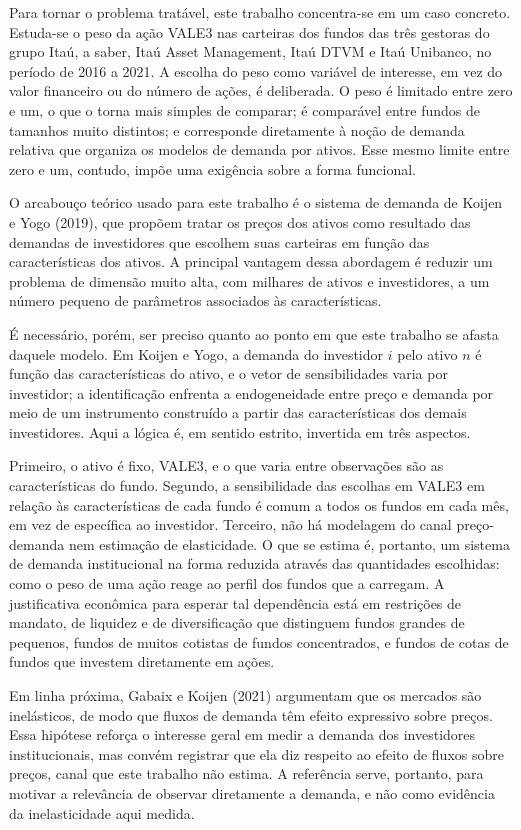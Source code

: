 \documentclass[12pt,a4paper]{article}
\begin{document}
Para tornar o problema tratável, este trabalho concentra-se em um caso concreto. Estuda-se o
peso da ação VALE3 nas carteiras dos fundos das três gestoras do grupo Itaú, a saber, Itaú
Asset Management, Itaú DTVM e Itaú Unibanco, no período de 2016 a 2021. A escolha do peso como
variável de interesse, em vez do valor financeiro ou do número de ações, é deliberada. O peso
é limitado entre zero e um, o que o torna mais simples de comparar; é comparável entre fundos
de tamanhos muito distintos; e corresponde diretamente à noção de demanda relativa que organiza
os modelos de demanda por ativos. Esse mesmo limite entre zero e um, contudo, impõe uma
exigência sobre a forma funcional.

O arcabouço teórico usado para este trabalho é o sistema de demanda de Koijen e Yogo (2019),
que propõem tratar os preços dos ativos como resultado das demandas de investidores que
escolhem suas carteiras em função das características dos ativos. A principal vantagem dessa
abordagem é reduzir um problema de dimensão muito alta, com milhares de ativos e investidores,
a um número pequeno de parâmetros associados às características.

É necessário, porém, ser preciso quanto ao ponto em que este trabalho se afasta daquele
modelo. Em Koijen e Yogo, a demanda do investidor $i$ pelo ativo $n$ é função das
características do ativo, e o vetor de sensibilidades varia por investidor; a identificação
enfrenta a endogeneidade entre preço e demanda por meio de um instrumento construído a partir
das características dos demais investidores. Aqui a lógica é, em sentido estrito, invertida em
três aspectos.

Primeiro, o ativo é fixo, VALE3, e o que varia entre observações são as características do
fundo. Segundo, a sensibilidade das escolhas em VALE3 em relação às características de cada
fundo é comum a todos os fundos em cada mês, em vez de específica ao investidor. Terceiro, não
há modelagem do canal preço-demanda nem estimação de elasticidade. O que se estima é, portanto,
um sistema de demanda institucional na forma reduzida através das quantidades escolhidas: como
o peso de uma ação reage ao perfil dos fundos que a carregam. A justificativa econômica para
esperar tal dependência está em restrições de mandato, de liquidez e de diversificação que
distinguem fundos grandes de pequenos, fundos de muitos cotistas de fundos concentrados, e
fundos de cotas de fundos que investem diretamente em ações.

Em linha próxima, Gabaix e Koijen (2021) argumentam que os mercados são inelásticos, de modo
que fluxos de demanda têm efeito expressivo sobre preços. Essa hipótese reforça o interesse
geral em medir a demanda dos investidores institucionais, mas convém registrar que ela diz
respeito ao efeito de fluxos sobre preços, canal que este trabalho não estima. A referência
serve, portanto, para motivar a relevância de observar diretamente a demanda, e não como
evidência da inelasticidade aqui medida.
\end{document}

